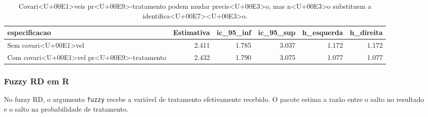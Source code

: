 \documentclass[
]{article}
\newenvironment{Shaded}{\begin{snugshade}}{\end{snugshade}}
\newcommand{\AttributeTok}[1]{\textcolor[rgb]{0.13,0.29,0.53}{#1}}
\newcommand{\DecValTok}[1]{\textcolor[rgb]{0.00,0.00,0.81}{#1}}
\newcommand{\FloatTok}[1]{\textcolor[rgb]{0.00,0.00,0.81}{#1}}
\newcommand{\FunctionTok}[1]{\textcolor[rgb]{0.13,0.29,0.53}{\textbf{#1}}}
\newcommand{\NormalTok}[1]{#1}
\newcommand{\OtherTok}[1]{\textcolor[rgb]{0.56,0.35,0.01}{#1}}
\newcommand{\SpecialCharTok}[1]{\textcolor[rgb]{0.81,0.36,0.00}{\textbf{#1}}}
\begin{document}
\begin{table}

\caption{\label{tab:tabela-rd-covs}Covari<U+00E1>veis pr<U+00E9>-tratamento podem mudar precis<U+00E3>o, mas n<U+00E3>o substituem a identifica<U+00E7><U+00E3>o.}
\centering
\begin{tabular}[t]{l|r|r|r|r|r}
\hline
especificacao & Estimativa & ic\_95\_inf & ic\_95\_sup & h\_esquerda & h\_direita\\
\hline
Sem covari<U+00E1>vel & 2.411 & 1.785 & 3.037 & 1.172 & 1.172\\
\hline
Com covari<U+00E1>vel pr<U+00E9>-tratamento & 2.432 & 1.790 & 3.075 & 1.077 & 1.077\\
\hline
\end{tabular}
\end{table}

\subsubsection{Fuzzy RD em R}\label{fuzzy-rd-em-r}

No fuzzy RD, o argumento \texttt{fuzzy} recebe a variável de tratamento efetivamente recebido. O pacote estima a razão entre o salto no resultado e o salto na probabilidade de tratamento.

\begin{Shaded}
\end{Shaded}
\end{document}
